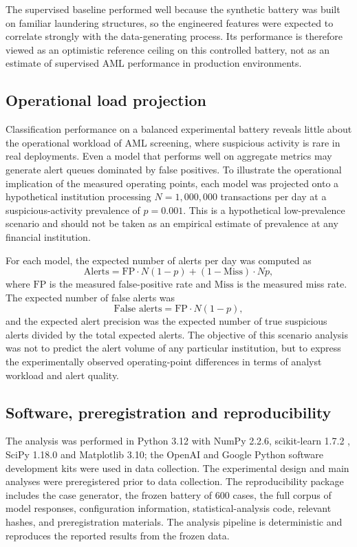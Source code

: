 \documentclass[pdflatex,sn-basic,Numbered]{sn-jnl}
\begin{document}
The supervised baseline performed well because the synthetic battery was built on familiar laundering structures, so the engineered features were expected to correlate strongly with the data-generating process. Its performance is therefore viewed as an optimistic reference ceiling on this controlled battery, not as an estimate of supervised AML performance in production environments.

\subsection{Operational load projection}

Classification performance on a balanced experimental battery reveals little about the operational workload of AML screening, where suspicious activity is rare in real deployments. Even a model that performs well on aggregate metrics may generate alert queues dominated by false positives. To illustrate the operational implication of the measured operating points, each model was projected onto a hypothetical institution processing $N = 1{,}000{,}000$ transactions per day at a suspicious-activity prevalence of $p = 0.001$. This is a hypothetical low-prevalence scenario and should not be taken as an empirical estimate of prevalence at any financial institution.

For each model, the expected number of alerts per day was computed as
\[
\text{Alerts} = \mathrm{FP}\cdot N(1-p) + (1-\mathrm{Miss})\cdot Np,
\]
where $\mathrm{FP}$ is the measured false-positive rate and $\mathrm{Miss}$ is the measured miss rate. The expected number of false alerts was
\[
\text{False alerts} = \mathrm{FP}\cdot N(1-p),
\]
and the expected alert precision was the expected number of true suspicious alerts divided by the total expected alerts. The objective of this scenario analysis was not to predict the alert volume of any particular institution, but to express the experimentally observed operating-point differences in terms of analyst workload and alert quality.

\subsection{Software, preregistration and reproducibility}

The analysis was performed in Python 3.12 with NumPy 2.2.6, scikit-learn 1.7.2 \cite{sklearn}, SciPy 1.18.0 and Matplotlib 3.10; the OpenAI and Google Python software development kits were used in data collection. The experimental design and main analyses were preregistered prior to data collection. The reproducibility package includes the case generator, the frozen battery of 600 cases, the full corpus of model responses, configuration information, statistical-analysis code, relevant hashes, and preregistration materials. The analysis pipeline is deterministic and reproduces the reported results from the frozen data.
\end{document}
